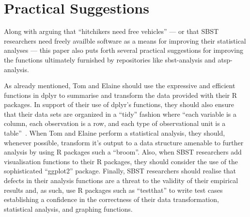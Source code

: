 
\vspace*{-.5em}

\section{Practical Suggestions}
\label{sec:suggestions}


Along with arguing that ``hitchikers need free vehicles'' --- or that SBST researchers need freely availble software as
a means for improving their statistical analyses --- this paper also puts forth several practical suggestions for
improving the functions ultimately furnished by repositories like sbst-analysis and atsp-analysis.

As already mentioned, Tom and Elaine should use the expressive and efficient functions in dplyr to summarise and
transform the data provided with their R packages. In support of their use of dplyr's functions, they should also ensure
that their data sets are organized in a ``tidy'' fashion where ``each variable is a column, each observation is a row,
and each type of observational unit is a table''~\cite{Wickham2014}. When Tom and Elaine perform a statistical analysis,
they should, whenever possible, transform it's output to a data structure amenable to further analysis by using R
packages such a ``broom''. Also, when SBST researchers add visualisation functions to their R packages, they should
consider the use of the sophisticated ``ggplot2'' package. Finally, SBST researchers should realise that defects in
their analysis functions are a threat to the validity of their empirical results and, as such, use R packages such as
``testthat'' to write test cases establishing a confidence in the correctness of their data transformation, statistical
analysis, and graphing functions.


